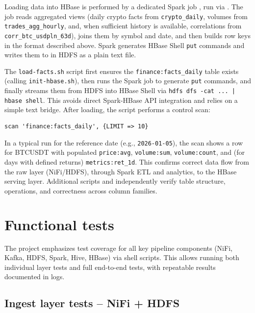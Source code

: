 \documentclass{article}
\begin{document}
Loading data into HBase is performed by a dedicated Spark job
, run via .
The job reads aggregated views (daily crypto facts from
\texttt{crypto\_daily}, volumes from \texttt{trades\_agg\_hourly}, and,
when sufficient history is available, correlations from
\texttt{corr\_btc\_usdpln\_63d}), joins them by symbol and date, and then
builds row keys in the format described above. Spark generates HBase Shell
\texttt{put} commands and writes them to
 in HDFS as a plain text file.

The \texttt{load-facts.sh} script first ensures the
\texttt{finance:facts\_daily} table exists (calling \texttt{init-hbase.sh}),
then runs the Spark job to generate \texttt{put} commands, and finally
streams them from HDFS into HBase Shell via
\texttt{hdfs dfs -cat ... | hbase shell}. This avoids direct Spark-HBase
API integration and relies on a simple text bridge. After loading, the
script performs a control scan:

\begin{lstlisting}
scan 'finance:facts_daily', {LIMIT => 10}
\end{lstlisting}

In a typical run for the reference date (e.g., \texttt{2026-01-05}), the
scan shows a row for BTCUSDT with populated \texttt{price:avg},
\texttt{volume:sum}, \texttt{volume:count}, and (for days with defined
returns) \texttt{metrics:ret\_1d}. This confirms correct data flow from
the raw layer (NiFi/HDFS), through Spark ETL and analytics, to the HBase
serving layer. Additional scripts  and
 independently verify table structure,
 operations, and correctness across column families.

\section{Functional tests}

The project emphasizes test coverage for all key pipeline components
(NiFi, Kafka, HDFS, Spark, Hive, HBase) via shell scripts. This allows
running both individual layer tests and full end-to-end tests, with
repeatable results documented in logs.

\subsection{Ingest layer tests -- NiFi + HDFS}
\end{document}
